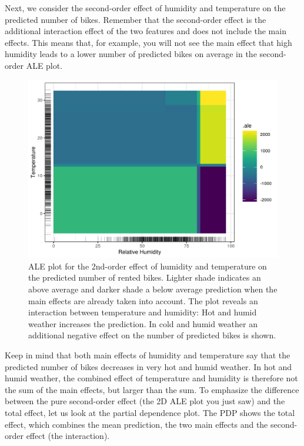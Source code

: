 \documentclass[12pt,]{krantz}
\begin{document}
Next, we consider the second-order effect of humidity and temperature on
the predicted number of bikes. Remember that the second-order effect is
the additional interaction effect of the two features and does not
include the main effects. This means that, for example, you will not see
the main effect that high humidity leads to a lower number of predicted
bikes on average in the second-order ALE plot.

\begin{figure}

{\centering \includegraphics[width=\textwidth]{images/ale-bike-2d-1} 

}

\caption{ALE plot for the 2nd-order effect of humidity and temperature on the predicted number of rented bikes. Lighter shade indicates an above average and darker shade a below average prediction when the main effects are already taken into account. The plot reveals an interaction between temperature and humidity: Hot and humid weather increases the prediction. In cold and humid weather an additional negative effect on the number of predicted bikes is shown.}\label{fig:ale-bike-2d}
\end{figure}

Keep in mind that both main effects of humidity and temperature say that
the predicted number of bikes decreases in very hot and humid weather.
In hot and humid weather, the combined effect of temperature and
humidity is therefore not the sum of the main effects, but larger than
the sum. To emphasize the difference between the pure second-order
effect (the 2D ALE plot you just saw) and the total effect, let us look
at the partial dependence plot. The PDP shows the total effect, which
combines the mean prediction, the two main effects and the second-order
effect (the interaction).
\end{document}
